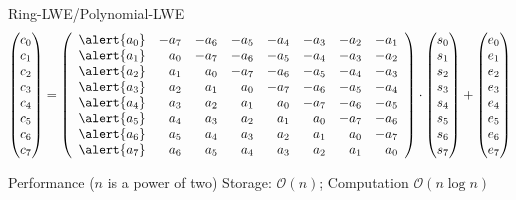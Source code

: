 \documentclass[xcolor=table,10pt,aspectratio=169]{beamer}
\begin{document}
\begin{frame}[label={sec:org6d125ba}]{Ring-LWE/Polynomial-LWE}
\[
\begin{pmatrix}c_{0} \\ c_{1} \\ c_{2} \\ c_{3} \\ c_{4} \\ c_{5} \\ c_{6} \\ c_{7}\end{pmatrix} = 
\left(\begin{array}{rrrrrrrr}
\alert{a_{0}} & -a_{7} & -a_{6} & -a_{5} & -a_{4} & -a_{3} & -a_{2} & -a_{1} \\
\alert{a_{1}} & a_{0} & -a_{7} & -a_{6} & -a_{5} & -a_{4} & -a_{3} & -a_{2} \\
\alert{a_{2}} & a_{1} & a_{0} & -a_{7} & -a_{6} & -a_{5} & -a_{4} & -a_{3} \\
\alert{a_{3}} & a_{2} & a_{1} & a_{0} & -a_{7} & -a_{6} & -a_{5} & -a_{4} \\
\alert{a_{4}} & a_{3} & a_{2} & a_{1} & a_{0} & -a_{7} & -a_{6} & -a_{5} \\
\alert{a_{5}} & a_{4} & a_{3} & a_{2} & a_{1} & a_{0} & -a_{7} & -a_{6} \\
\alert{a_{6}} & a_{5} & a_{4} & a_{3} & a_{2} & a_{1} & a_{0} & -a_{7} \\
\alert{a_{7}} & a_{6} & a_{5} & a_{4} & a_{3} & a_{2} & a_{1} & a_{0}
\end{array}\right)\cdot
\begin{pmatrix}s_{0} \\ s_{1} \\ s_{2} \\ s_{3} \\ s_{4} \\ s_{5} \\ s_{6} \\ s_{7}\end{pmatrix} +
\begin{pmatrix}e_{0} \\ e_{1} \\ e_{2} \\ e_{3} \\ e_{4} \\ e_{5} \\ e_{6} \\ e_{7}\end{pmatrix}
\]
\begin{block}{Performance (\(n\) is a power of two)}
Storage: \(\mathcal{O}(n)\); Computation \(\mathcal{O}(n \log n)\)
\end{block}
\end{frame}
\end{document}
